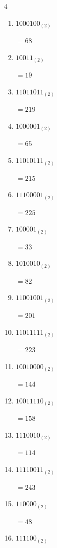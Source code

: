 \begin{multicols}{4}
\begin{enumerate}
        $=65$

  \item $1000100_{(2)}$

        $=68$

  \item $10011_{(2)}$

        $=19$

  \item $11011011_{(2)}$

        $=219$

  \item $1000001_{(2)}$

        $=65$

  \item $11010111_{(2)}$

        $=215$

  \item $11100001_{(2)}$

        $=225$

  \item $100001_{(2)}$

        $=33$

\columnbreak %

  \item $1010010_{(2)}$

        $=82$

  \item $11001001_{(2)}$

        $=201$

  \item $11011111_{(2)}$

        $=223$

  \item $10010000_{(2)}$

        $=144$

  \item $10011110_{(2)}$

        $=158$

  \item $1110010_{(2)}$

        $=114$

  \item $11110011_{(2)}$

        $=243$

  \item $110000_{(2)}$

        $=48$

  \item $111100_{(2)}$


\end{enumerate}
\end{multicols}

